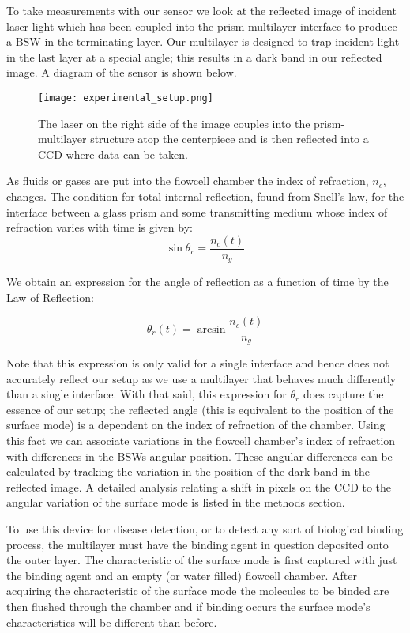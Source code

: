 \begin{flushleft}
	\hspace{0.25in}
	To take measurements with our sensor we look at the reflected image of incident laser light which has been coupled into the prism-multilayer interface to produce a BSW in the terminating layer. Our multilayer is designed to trap incident light in the last layer at a special angle; this results in a dark band in our reflected image. A diagram of the sensor is shown below.

	\begin{figure}[h]
		\begin{center}
			\texttt{[image: experimental\_setup.png]}
			\caption{The laser on the right side of the image couples into the prism-multilayer structure atop the centerpiece and is then reflected into a CCD where data can be taken.}
			\label{fig:SETUP}
		\end{center}
	\end{figure}

	As fluids or gases are put into the flowcell chamber the index of refraction, $n_c$, changes. The condition for total internal reflection, found from Snell's law, for the interface between a glass prism and some transmitting medium whose index of refraction varies with time is given by:
	\[
		\sin{\theta_c} = \frac{n_c(t)}{n_g}
	\]

	We obtain an expression for the angle of reflection as a function of time by the Law of Reflection:

	\[
		\theta_r(t) = \arcsin{\frac{n_c(t)}{n_g}}
	\]

	Note that this expression is only valid for a single interface and hence does not accurately reflect our setup as we use a multilayer that behaves much differently than a single interface. With that said, this expression for $\theta_r$ does capture the essence of our setup; the reflected angle (this is equivalent to the position of the surface mode) is a dependent on the index of refraction of the chamber. Using this fact we can associate variations in the flowcell chamber's index of refraction with differences in the BSWs angular position. These angular differences can be calculated by tracking the variation in the position of the dark band in the reflected image. A detailed analysis relating a shift in pixels on the CCD to the angular variation of the surface mode is listed in the methods section.

	\hspace{0.25in}
	To use this device for disease detection, or to detect any sort of biological binding process, the multilayer must have the binding agent in question deposited onto the outer layer. The characteristic of the surface mode is first captured with just the binding agent and an empty (or water filled) flowcell chamber. After acquiring the characteristic of the surface mode the molecules to be binded are then flushed through the chamber and if binding occurs the surface mode's characteristics will be different than before.
	\pagestyle{empty}
\end{flushleft}
